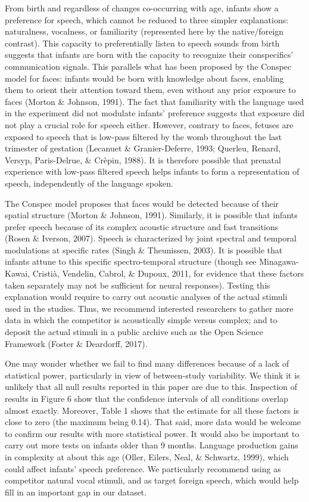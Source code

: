 \documentclass[man,floatsintext]{apa6}
\begin{document}
From birth and regardless of changes co-occurring with age, infants show a preference for speech, which cannot be reduced to three simpler explanations: naturalness, vocalness, or familiarity (represented here by the native/foreign contrast). This capacity to preferentially listen to speech sounds from birth suggests that infants are born with the capacity to recognize their conspecifics' communication signals. This parallels what has been proposed by the Conspec model for faces: infants would be born with knowledge about faces, enabling them to orient their attention toward them, even without any prior exposure to faces (Morton \& Johnson, 1991). The fact that familiarity with the language used in the experiment did not modulate infants' preference suggests that exposure did not play a crucial role for speech either. However, contrary to faces, fetuses are exposed to speech that is low-pass filtered by the womb throughout the last trimester of gestation (Lecanuet \& Granier-Deferre, 1993; Querleu, Renard, Versyp, Paris-Delrue, \& Crèpin, 1988). It is therefore possible that prenatal experience with low-pass filtered speech helps infants to form a representation of speech, independently of the language spoken.

The Conspec model proposes that faces would be detected because of their spatial structure (Morton \& Johnson, 1991). Similarly, it is possible that infants prefer speech because of its complex acoustic structure and fast transitions (Rosen \& Iverson, 2007). Speech is characterized by joint spectral and temporal modulations at specific rates (Singh \& Theunissen, 2003). It is possible that infants attune to this specific spectro-temporal structure (though see Minagawa-Kawai, Cristià, Vendelin, Cabrol, \& Dupoux, 2011, for evidence that these factors taken separately may not be sufficient for neural responses). Testing this explanation would require to carry out acoustic analyses of the actual stimuli used in the studies. Thus, we recommend interested researchers to gather more data in which the competitor is acoustically simple versus complex; and to deposit the actual stimuli in a public archive such as the Open Science Framework (Foster \& Deardorff, 2017).

One may wonder whether we fail to find many differences because of a lack of statistical power, particularly in view of between-study variability. We think it is unlikely that all null results reported in this paper are due to this. Inspection of results in Figure 6 show that the confidence intervals of all conditions overlap almost exactly. Moreover, Table 1 shows that the estimate for all these factors is close to zero (the maximum being 0.14). That said, more data would be welcome to confirm our results with more statistical power. It would also be important to carry out more tests on infants older than 9 months. Language production gains in complexity at about this age (Oller, Eilers, Neal, \& Schwartz, 1999), which could affect infants' speech preference. We particularly recommend using as competitor natural vocal stimuli, and as target foreign speech, which would help fill in an important gap in our dataset.
\end{document}
